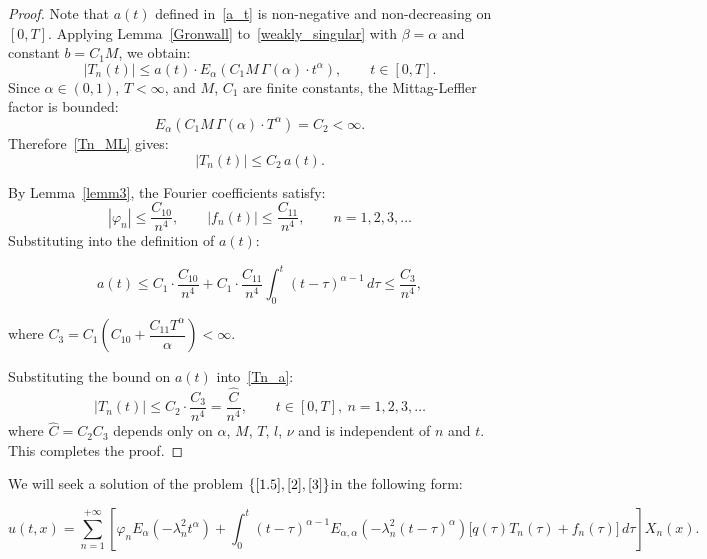\documentclass[reqno]{amsart}
\theoremstyle{definition}
\numberwithin{equation}{section}
\begin{document}
\begin{proof}
Note that $a(t)$ defined in~\eqref{a_t} is non-negative and 
non-decreasing on $[0,T]$. 
Applying Lemma~\ref{Gronwall} to~\eqref{weakly_singular} 
with $\beta=\alpha$ and constant $b=C_1 M$, we obtain:
\begin{equation}\label{Tn_ML}
    |T_n(t)| \leq a(t)\cdot 
    E_{\alpha}\!\left(C_1 M\,\Gamma(\alpha)\cdot t^{\alpha}\right),
    \qquad t\in[0,T].
\end{equation}
Since $\alpha\in(0,1)$, $T<\infty$, and $M$, $C_1$ are finite constants, 
the Mittag-Leffler factor is bounded:
\begin{equation*}
    E_{\alpha}\!\left(C_1 M\,\Gamma(\alpha)\cdot T^{\alpha}\right) 
    = C_2 < \infty.
\end{equation*}
Therefore~\eqref{Tn_ML} gives:
\begin{equation}\label{Tn_a}
    |T_n(t)| \leq C_2\, a(t).
\end{equation}



By Lemma~\ref{lemm3}, the Fourier coefficients satisfy:
\begin{equation*}
    |\varphi_n| \leq \frac{C_{10}}{n^4}, 
    \qquad 
    |f_n(t)| \leq \frac{C_{11}}{n^4}, 
    \qquad n=1,2,3,\ldots
\end{equation*}
Substituting into the definition of $a(t)$:

\begin{equation*}
    a(t)\leq C_1\cdot\frac{C_{10}}{n^4}
 + C_1\cdot\frac{C_{11}}{n^4}\int_0^t(t-\tau)^{\alpha-1}\,d\tau\leq \frac{C_3}{n^{4}}, 
\end{equation*}

where $C_3 = C_1\!\left(C_{10}+\dfrac{C_{11}T^{\alpha}}{\alpha}\right)<\infty$.

Substituting the bound on $a(t)$ into~\eqref{Tn_a}:
\begin{equation*}
    |T_n(t)| \leq C_2\cdot\frac{C_3}{n^4} 
              =\frac{\widehat{C}}{n^4}, 
    \qquad t\in[0,T],\ n=1,2,3,\ldots
\end{equation*}
where $\widehat{C} = C_2 C_3$ depends only on 
$\alpha$, $M$, $T$, $l$, $\nu$ and is independent of $n$ and $t$. 
This completes the proof.


\end{proof}
We will seek a solution of the problem $\{\eqref{1.5},\eqref{2},\eqref{3}\}$in the following form:

\begin{equation}\label{4.2}
    u(t, x)=\sum_{n=1}^{+\infty}\left[\varphi_n E_{\alpha}\!\left(-\lambda_n^2 t^{\alpha}\right)
+
\int_0^t
(t-\tau)^{\alpha-1}
E_{\alpha,\alpha}\!\left(-\lambda_n^2 (t-\tau)^{\alpha}\right)
\big[q(\tau)T_n(\tau)+f_n(\tau)\big]
\, d\tau\right] X_n(x).
\end{equation}
\end{document}
